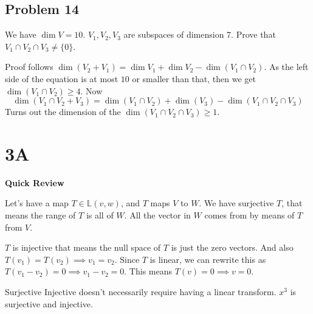 \documentclass[letter]{article}
\begin{document}
\subsection{Problem 14} 
We have $\dim V = 10$. $V_1,V_2, V_3$ are subspaces of dimension $ 7$. Prove that $V_1 \cap V_2 \cap  V_3 \neq \{0\} $.

Proof follows $\dim(V_2 + V_1) = \dim V_1 + \dim V_2 - \dim(V_1 \cap  V_2)$. As the left side of the equation is at most $10$ or smaller than that, then we get $\dim (V_1 \cap V_2) \ge 4$. Now
\[
\dim (V_1 \cap  V_2 + V_3) = \dim(V_1 \cap  V_2) + \dim (V_3) - \dim(V_1 \cap  V_2 \cap V_3)
\] 
Turns out the dimension of the $\dim(V_1 \cap  V_2 \cap  V_3) \ge 1$.

\section{3A} 

\textbf{Quick Review}

Let's have a map $T \in  \mathbb{L}(v,w)$, and $T$ maps $V$ to $W$. We have surjective $T$, that means the range of $T$ is all of $W$. All the vector in $W$ comes from by means of $T$ from $V$. 

$T$ is injective that means the null space of $T$ is just the zero vectors. And also $T(v_1) = T(v_2) \implies v_1 = v_2$. Since $T$ is linear, we can rewrite this as $T(v_1 - v_2) = 0 \implies v_1 - v_2 = 0$. This means $T(v) = 0 \implies v = 0$. 

Surjective Injective doesn't necessarily require having a linear transform. $x^3$ is surjective and injective. 
\end{document}
